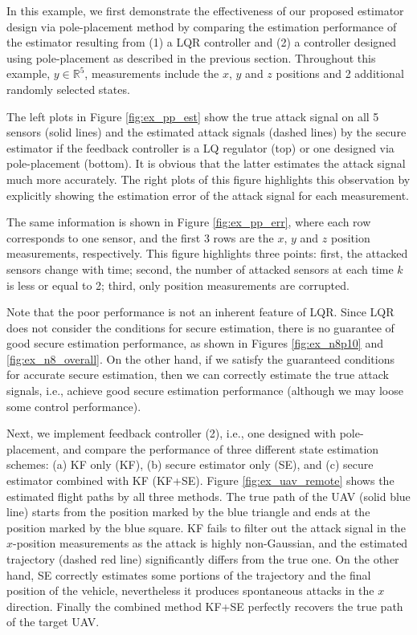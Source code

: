 \documentclass[../../thesis.tex]{subfiles}
\begin{document}
In this example, we first demonstrate the effectiveness of our proposed estimator design via pole-placement method by comparing the estimation performance of the estimator resulting from (1) a LQR controller and (2) a controller designed using pole-placement as described in the previous section.
Throughout this example, $y \in \mathbb{R}^5$, measurements include the $x$, $y$ and $z$ positions and 2 additional randomly selected states. 

The left plots in Figure \ref{fig:ex_pp_est} show the true attack signal on all 5 sensors (solid lines) and the estimated attack signals (dashed lines) by the secure estimator if the feedback controller is a LQ regulator (top) or one designed via pole-placement (bottom). It is obvious that the latter estimates the attack signal much more accurately. The right plots of this figure highlights this observation by explicitly showing the estimation error of the attack signal for each measurement.

The same information is shown in Figure \ref{fig:ex_pp_err}, where each row corresponds to one sensor, and the first 3 rows are the $x$, $y$ and $z$ position measurements, respectively. This figure highlights three points: first, the attacked sensors change with time; second, the number of attacked sensors at each time $k$ is less or equal to 2; third, only position measurements are corrupted.

 
Note that the poor performance is not an inherent feature of LQR. 
Since LQR does not consider the conditions for secure estimation, there is no guarantee of good secure estimation performance, as shown in Figures \ref{fig:ex_n8p10} and \ref{fig:ex_n8_overall}.
On the other hand, if we satisfy the guaranteed conditions for accurate secure estimation, then we can correctly estimate the true attack signals, i.e., achieve good secure estimation performance (although we may loose some control performance).

Next, we implement feedback controller (2), i.e., one designed with pole-placement, and compare the performance of three different state estimation schemes: (a) KF only (KF), (b) secure estimator only (SE), and (c) secure estimator combined with KF (KF+SE). 
Figure \ref{fig:ex_uav_remote} shows the estimated flight paths by all three methods.
The true path of the UAV (solid blue line) starts from the position marked by the blue triangle and ends at the position marked by the blue square. KF fails to filter out the attack signal in the $x$-position measurements as the attack is highly non-Gaussian, and the estimated trajectory (dashed red line) significantly differs from the true one. On the other hand, SE correctly estimates some portions of the trajectory and the final position of the vehicle, nevertheless it produces spontaneous attacks in the $x$ direction. 
Finally the combined method KF+SE perfectly recovers the true path of the target UAV.
\end{document}
